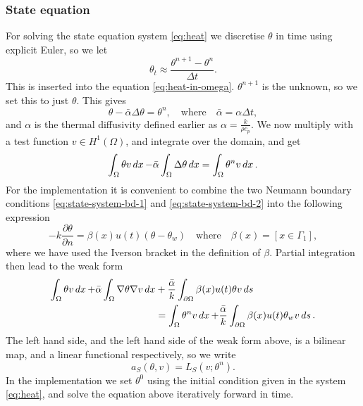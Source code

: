 \subsubsection{State equation}

For solving the state equation system \eqref{eq:heat} we discretise $\theta$ in time using explicit Euler, so we let
\begin{equation*}
    \theta_t \approx \frac{\theta^{n+1} - \theta^n}{\Delta t}.
\end{equation*}
This is inserted into the equation \eqref{eq:heat-in-omega}. $\theta^{n+1}$ is the unknown, so we set this to just $\theta$. This gives
\begin{equation*}
    \theta - \bar{\alpha}\Delta \theta = \theta^n, \quad\textrm{where}\quad \bar{\alpha} = \alpha\Delta t,
\end{equation*}
and $\alpha$ is the thermal diffusivity defined earlier as $\alpha = \frac{k}{\rho c_p}$. We now multiply with a test function $v\in H^1(\Omega)$, and integrate over the domain, and get
\begin{equation*}
    \int_\Omega \theta v \mathop{dx} - \bar{\alpha}\int_\Omega \Delta\theta\mathop{dx} = \int_\Omega \theta^n v\mathop{dx}.
\end{equation*}
For the implementation it is convenient to combine the two Neumann boundary conditions \eqref{eq:state-system-bd-1} and \eqref{eq:state-system-bd-2} into the following expression
\begin{equation*}
    -k\frac{\partial \theta}{\partial n} = \beta(x)u(t)(\theta - \theta_w) \quad\text{where}\quad \beta(x) = [x\in\Gamma_1],
\end{equation*}
where we have used the Iverson bracket in the definition of $\beta$. Partial integration then lead to the weak form
\begin{equation*}
\begin{aligned}
    \int_\Omega \theta v\mathop{dx} + \bar{\alpha}\int_\Omega\nabla\theta\nabla v\mathop{dx} &+ \frac{\bar{\alpha}}{k}\int_{\partial\Omega}\beta(x)u(t)\theta v\mathop{ds} \\
    &= \int_\Omega\theta^n v\mathop{dx} + \frac{\bar{\alpha}}{k}\int_{\partial\Omega}\beta(x)u(t)\theta_w v\mathop{ds}.
\end{aligned}
\end{equation*}
The left hand side, and the left hand side of the weak form above, is a bilinear map, and a linear functional respectively, so we write
\begin{equation*}
    a_S(\theta, v) = L_S(v; \theta^n).
\end{equation*}
In the implementation we set $\theta^0$ using the initial condition given in the system \eqref{eq:heat}, and solve the equation above iteratively forward in time.


